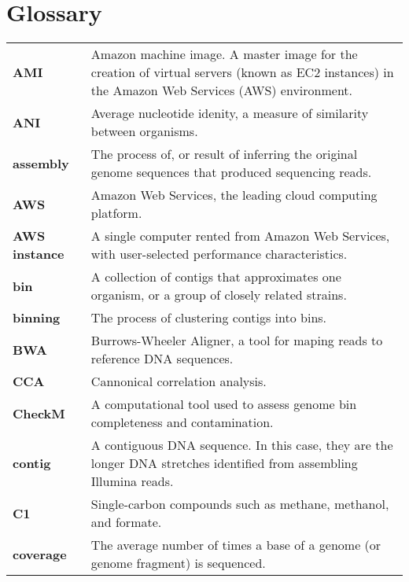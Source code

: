 \chapter*{Glossary} %
\renewcommand*{\arraystretch}{1.4} %

\begin{singlespace}
\begin{longtable}{ p{}  p{} }

\textbf{AMI} & Amazon machine image.  A master image for the creation of virtual servers (known as EC2 instances)
                in the Amazon Web Services (AWS) environment. \\
\textbf{ANI} & Average nucleotide idenity, a measure of similarity between organisms. \\
\textbf{assembly} &  The process of, or result of inferring the original genome sequences that produced sequencing reads. \\
\textbf{AWS} & Amazon Web Services, the leading cloud computing platform. \\
\textbf{AWS instance} & A single computer rented from Amazon Web Services, with user-selected performance characteristics. \\
\textbf{bin} & A collection of contigs that approximates one organism, or a group of closely related strains. \\
\textbf{binning} &  The process of clustering contigs into bins.  \\ %
\textbf{BWA} & Burrows-Wheeler Aligner, a tool for maping reads to reference DNA sequences. \\
\textbf{CCA} & Cannonical correlation analysis. \\
\textbf{CheckM} &  A computational tool used to assess genome bin completeness and contamination. \\
\textbf{contig} & A contiguous DNA sequence.  In this case, they are the longer DNA stretches identified from assembling Illumina reads. \\
\textbf{C1} & Single-carbon compounds such as methane, methanol, and formate. \\
\textbf{coverage} & The average number of times a base of a genome (or genome fragment) is sequenced.  \\

\end{longtable}
\end{singlespace}
